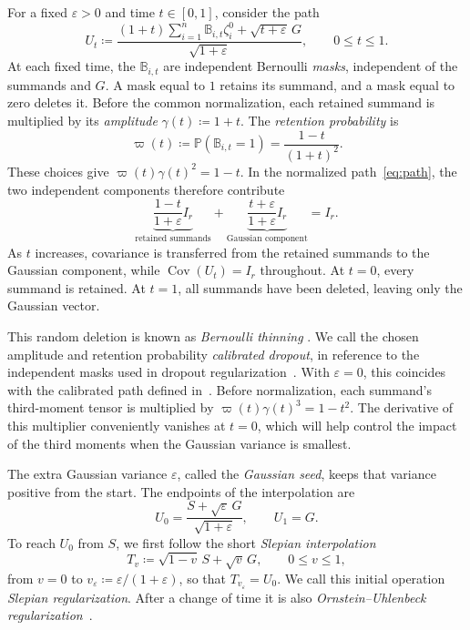 \documentclass[11pt,letterpaper]{article}
\theoremstyle{remark}
\newcommand{\Pp}{\mathbb P}
\newcommand{\Cov}{\operatorname{Cov}}
\begin{document}
For a fixed \(\varepsilon>0\) and time \(t\in[0,1]\), consider the path
\begin{equation}
 U_t\coloneqq
 \frac{(1+t)\sum_{i=1}^n\mathbb B_{i,t}\zeta_i^0
             +\sqrt{t+\varepsilon}\,G}{\sqrt{1+\varepsilon}},
 \qquad 0\le t\le1.
 \label{eq:path}
\end{equation}
At each fixed time, the \(\mathbb B_{i,t}\) are independent Bernoulli
\emph{masks}, independent of the summands and \(G\). A mask equal to \(1\) retains
its summand, and a mask equal to zero deletes it. Before the common
normalization, each retained summand is multiplied by its \emph{amplitude}
\(\gamma(t)\coloneqq1+t\). The \emph{retention probability} is
\[
 \varpi(t)\coloneqq\Pp(\mathbb B_{i,t}=1)
             =\frac{1-t}{(1+t)^2}.
\]
These choices give \(\varpi(t)\gamma(t)^2=1-t\). In the normalized
path~\eqref{eq:path}, the two independent components therefore contribute
\[
 \underbrace{\frac{1-t}{1+\varepsilon}I_r}_{\text{retained summands}}
 +\underbrace{\frac{t+\varepsilon}{1+\varepsilon}I_r}_{\text{Gaussian component}}
 =I_r.
\]
As \(t\) increases, covariance is transferred from the retained summands
to the Gaussian component, while \(\Cov(U_t)=I_r\) throughout.
At \(t=0\), every summand is retained. At \(t=1\), all summands have
been deleted, leaving only the Gaussian vector.

This random deletion is known as \emph{Bernoulli thinning}
\cite{Renyi1956,SteutelHarn1979,LastPenrose2017}. We call the
chosen amplitude and retention probability \emph{calibrated dropout},
in reference to the independent masks used in dropout regularization~\cite{Dropout2014}.
With \(\varepsilon=0\), this coincides with the calibrated path
defined in~\cite[Section~4]{AL}. Before normalization, each summand's third-moment tensor is multiplied
by \(\varpi(t)\gamma(t)^3=1-t^2\). The derivative of this multiplier
conveniently vanishes at \(t=0\), which will help control the impact of
the third moments when the Gaussian variance is smallest.

The extra Gaussian variance \(\varepsilon\), called the
\emph{Gaussian seed}, keeps that variance positive from the start.
The endpoints of the interpolation are
\[
 U_0=\frac{S+\sqrt\varepsilon\,G}{\sqrt{1+\varepsilon}},
 \qquad U_1=G.
\]
To reach \(U_0\) from \(S\), we first follow the short
\emph{Slepian interpolation}
\[
 T_v\coloneqq\sqrt{1-v}\,S+\sqrt v\,G,\qquad 0\le v\le1,
\]
from \(v=0\) to \(v_\varepsilon\coloneqq
\varepsilon/(1+\varepsilon)\), so that \(T_{v_\varepsilon}=U_0\).
We call this initial operation \emph{Slepian regularization}.
After a change of time it is also
\emph{Ornstein--Uhlenbeck regularization}~\cite[Theorem~4.12]{Nourdin2012}.
\end{document}
